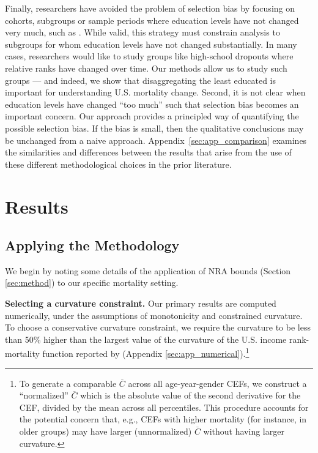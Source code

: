 \documentclass[12pt,letterpaper]{article}
\numberwithin{equation}{section}
\begin{document}
Finally, researchers have avoided the problem of selection bias by focusing on cohorts, subgroups or sample periods where education levels have not changed very much, such as \citet{Case2015,Case2017}. While valid, this strategy must constrain analysis to subgroups for whom education levels have not changed substantially. In many cases, researchers would like to study groups like high-school dropouts where relative ranks have changed over time. Our methods allow us to study such groups --- and indeed, we show that disaggregating the least educated is important for understanding U.S. mortality change. Second, it is not clear when education levels have changed ``too much'' such that selection bias becomes an important concern. Our approach provides a principled way of quantifying the possible selection bias. If the bias is small, then the qualitative conclusions may be unchanged from a naive approach. Appendix~\ref{sec:app_comparison} examines the similarities and differences between the results that arise from the use of these different methodological choices in the prior literature.

\section{Results}
\label{sec:results}

\subsection{Applying the Methodology}

We begin by noting some details of the application of NRA bounds (Section \ref{sec:method}) to our specific mortality setting. 

\textbf{Selecting a curvature constraint.} Our primary results are
computed numerically, under the assumptions of monotonicity and
constrained curvature. To choose a conservative curvature constraint,
we require the curvature to be less than 50\% higher than the largest value of
the curvature of the U.S. income rank-mortality function reported by
\citet{Chetty2016b} (Appendix \ref{sec:app_numerical}).\footnote{To
  generate a comparable $\overline{C}$ across all age-year-gender
  CEFs, we construct a ``normalized'' $\overline{C}$ which is the
  absolute value of the second derivative for the CEF, divided by the
  mean across all percentiles. This procedure accounts for the
  potential concern that, e.g., CEFs with higher mortality (for
  instance, in older groups) may have larger (unnormalized)
  $\overline{C}$ without having larger curvature.} 
\end{document}
